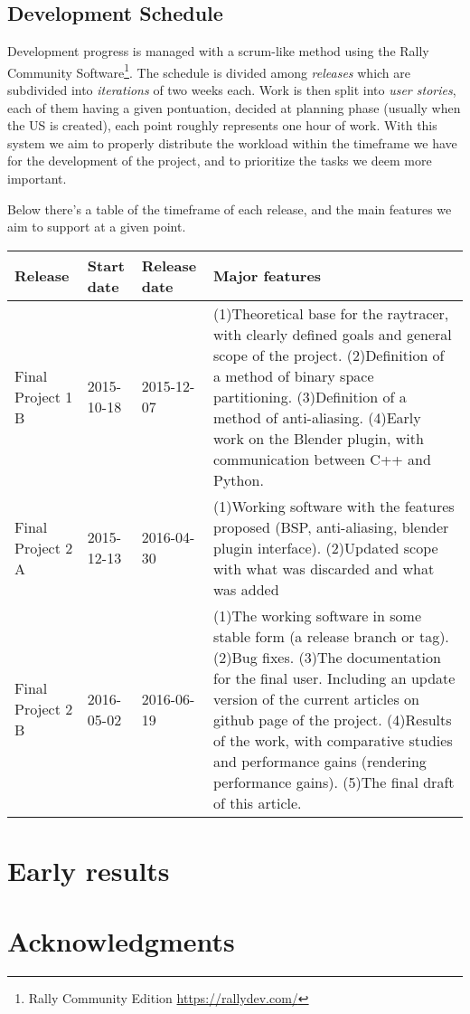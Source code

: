 \documentclass[a4paper]{sbgames}               %
\begin{document}
\subsection{Development Schedule}

Development progress is managed with a scrum-like method using the
Rally Community Software\footnote{Rally Community Edition
 \url{https://rallydev.com/}}. The schedule is divided among
\emph{releases} which are subdivided into \emph{iterations} of two
weeks each. Work is then split into \emph{user stories}, each of them
having a given pontuation, decided at planning phase (usually when the
US is created), each point roughly represents one hour of work. With
this system we aim to properly distribute the workload within the
timeframe we have for the development of the project, and to
prioritize the tasks we deem more important.

Below there's a table of the timeframe of each release, and the main
features we aim to support at a given point.

\begin{tabular}{ | l | l | l | p{8cm} |}
  \hline
  Release & Start date & Release date & Major features \\ \hline
  Final Project 1 B & 2015-10-18 & 2015-12-07 & (1)Theoretical base for the raytracer, with clearly defined goals and
                                                general scope of the project. (2)Definition of a method of binary
                                                space partitioning. (3)Definition of a method of anti-aliasing.
                                                (4)Early work on the Blender plugin, with communication between C++ and Python. \\ \hline
  Final Project 2 A & 2015-12-13 & 2016-04-30 & (1)Working software with the features proposed (BSP, anti-aliasing, blender plugin interface).
                                                (2)Updated scope with what was discarded and what was added \\ \hline
  Final Project 2 B & 2016-05-02 & 2016-06-19 & (1)The working software in some stable form (a release branch or tag). (2)Bug fixes.
                                                (3)The documentation for the final user. Including an update version of
                                                the current articles on github page of the project. (4)Results of the work,
                                                with comparative studies and performance gains (rendering performance gains).
                                                (5)The final draft of this article. \\ \hline
\end{tabular}

\section{Early results}
\label{sec:conclusion}

\section*{Acknowledgments}




\end{document}
